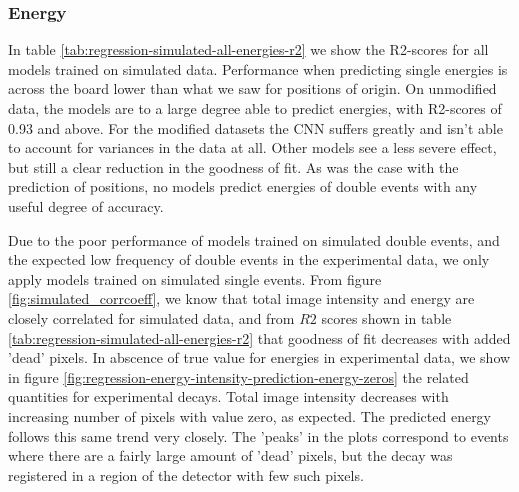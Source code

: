 \subsubsection{Energy}
In table \ref{tab:regression-simulated-all-energies-r2} we show the R2-scores for all
models trained on simulated data.
Performance when predicting single energies is across the board lower than what we saw
for positions of origin. On unmodified data, the models are to a large degree able to
predict energies, with R2-scores of 0.93 and above. For the modified datasets the CNN
suffers greatly and isn't able to account for variances in the data at all. Other models
see a less severe effect, but still a clear reduction in the goodness of fit.
As was the case with the prediction of positions, no models predict energies
of double events with any useful degree of accuracy.


Due to the poor performance of models trained on simulated double events, and the
expected low frequency of double events in the experimental data, we only apply models
trained on simulated single events. From figure \ref{fig:simulated_corrcoeff}, we know
that total image intensity and energy are closely correlated for simulated data,
and from $R2$ scores shown in table \ref{tab:regression-simulated-all-energies-r2}
that goodness of fit decreases with added 'dead' pixels. In abscence of true value for
energies in experimental data, we show in figure \ref{fig:regression-energy-intensity-prediction-energy-zeros}
the related quantities for experimental decays. Total image intensity decreases with
increasing number of pixels with value zero, as expected. The predicted energy
follows this same trend very closely. The 'peaks' in the plots correspond to events
where there are a fairly large amount of 'dead' pixels, but the decay was registered
in a region of the detector with few such pixels.


